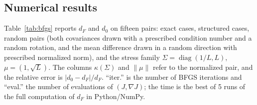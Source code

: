 \subsection{Numerical results}

Table~\ref{tab:bfgs} reports $d_F$ and $d_0$ on fifteen pairs: exact cases, structured cases,
random pairs (both covariances drawn with a prescribed condition number and a random rotation, and the mean
difference drawn in a random direction with prescribed normalized norm), and the stress family
$\Sigma=\operatorname{diag}(1/L,L)$, $\mu=(1,\sqrt L)$.
The columns $\kappa(\Sigma)$ and $\|\mu\|$ refer to the normalized pair, and the relative error is
$|d_0-d_F|/d_F$. ``iter.'' is the number of BFGS iterations and ``eval.'' the number of evaluations of
$(J,\nabla J)$; the time is the best of 5 runs of the full computation of $d_F$ in Python/NumPy.

